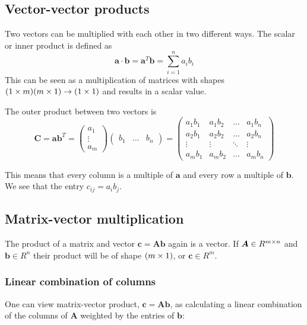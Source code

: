 \subsection{Vector-vector products}
Two vectors can be multiplied with each other in two different ways. 
The scalar or inner product is defined as 
\begin{equation}
    \bm{a} \cdot \bm{b} = \bm{a}^T \bm{b} = \sum_{i=1}^n a_i b_i 
\end{equation}
This can be seen as a multiplication of matrices with shapes $(1 \times m)(m \times 1) \rightarrow (1 \times 1)$ and results in a scalar value.

The outer product between two vectors is 
\begin{equation}
    \bm{C} = \bm{a}\bm{b}^T = \begin{pmatrix}
    a_{1} \\
    \vdots \\
    a_{m}
    \end{pmatrix}
    \begin{pmatrix}
        b_1 & \hdots & b_n
    \end{pmatrix} = 
    \begin{pmatrix}
        a_1 b_1 & a_1 b_2 & \hdots & a_1 b_n \\
        a_2 b_1 & a_2 b_2 & \hdots & a_2 b_n \\
        \vdots & \vdots   & \ddots & \vdots  \\
        a_m b_1 & a_m b_2 & \hdots & a_m b_n
    \end{pmatrix}
\end{equation}

This means that every column is a multiple of $\bm{a}$ and every row a multiple of $\bm{b}$. 
We see that the entry $c_{ij} = a_i b_j$.

\subsection{Matrix-vector multiplication}
The product of a matrix and vector $\bm{c} = \bm{A}\bm{b}$ again is a vector. 
If $\bm{A} \in R^{m \times n}$ and $\bm{b} \in R^n$ their product
will be of shape $(m \times 1)$, or $\bm{c} \in R^m$.

\subsubsection{Linear combination of columns}

One can view matrix-vector product, $\bm{c} = \bm{Ab}$, as calculating a linear combination of the columns of $\bm{A}$ weighted by 
the entries of $\bm{b}$:

